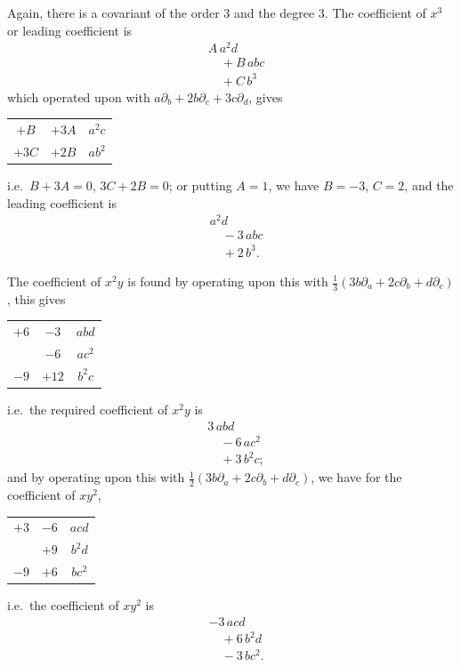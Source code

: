 \documentclass[11pt]{article}
\begin{document}
Again, there is a covariant of the order 3 and the degree 3. The coefficient of $x^3$ or leading coefficient is
\begin{align*}
&A\,a^2 d \\
&\quad + B\,abc \\
&\quad + C\,b^3
\end{align*}
which operated upon with $a\partial_b + 2b\partial_c + 3c\partial_d$, gives
\begin{center}
\begin{tabular}{ccc}
$+ B$ & $+ 3 A$ & $a^2 c$ \\
$+ 3 C$ & $+ 2 B$ & $a b^2$ \\
\end{tabular}
\end{center}
i.e.\ $B + 3 A = 0$, $3 C + 2 B = 0$; or putting $A = 1$, we have $B = -3$, $C = 2$, and the leading coefficient is
\begin{align*}
&a^2 d \\
&\quad - 3\,abc \\
&\quad + 2\,b^3.
\end{align*}

The coefficient of $x^2 y$ is found by operating upon this with $\tfrac{1}{3}(3 b\partial_a + 2c\partial_b + d\partial_c)$, this gives
\begin{center}
\begin{tabular}{ccc}
$+ 6$ & $- 3$ & $abd$ \\
      & $- 6$ & $ac^2$ \\
$- 9$ & $+ 12$ & $b^2 c$ \\
\end{tabular}
\end{center}
i.e.\ the required coefficient of $x^2 y$ is
\begin{align*}
&3\,abd \\
&\quad - 6\,ac^2 \\
&\quad + 3\,b^2 c;
\end{align*}
and by operating upon this with $\tfrac{1}{2}(3b\partial_a + 2c\partial_b + d\partial_c)$, we have for the coefficient of $xy^2$,
\begin{center}
\begin{tabular}{ccc}
$+ 3$ & $- 6$ & $acd$ \\
      & $+ 9$ & $b^2 d$ \\
$- 9$ & $+ 6$ & $bc^2$ \\
\end{tabular}
\end{center}
i.e.\ the coefficient of $xy^2$ is
\begin{align*}
&-3\,acd \\
&\quad + 6\,b^2 d \\
&\quad - 3\,bc^2.
\end{align*}
\end{document}
